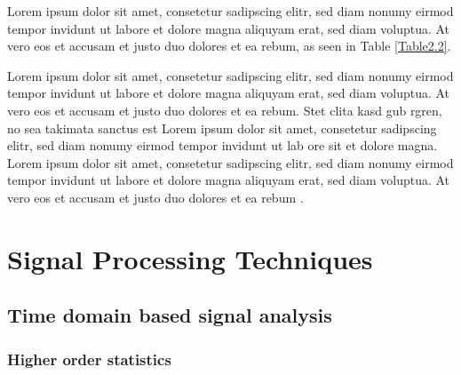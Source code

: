 
Lorem ipsum dolor sit amet, consetetur sadipscing elitr, sed diam nonumy eirmod tempor invidunt ut labore et dolore magna aliquyam erat, sed diam voluptua. At vero eos et accusam et justo duo dolores et ea rebum, as seen in Table \ref{Table2.2}. 

Lorem ipsum dolor sit amet, consetetur sadipscing elitr, sed diam nonumy eirmod tempor invidunt ut labore et dolore magna aliquyam erat, sed diam voluptua. At vero eos et accusam et justo duo dolores et ea rebum. Stet clita kasd gub rgren, no sea takimata sanctus est Lorem ipsum dolor sit amet, consetetur sadipscing elitr, sed diam nonumy eirmod tempor invidunt ut lab ore sit et dolore magna. Lorem ipsum dolor sit amet, consetetur sadipscing elitr, sed diam nonumy eirmod tempor invidunt ut labore et dolore magna aliquyam erat, sed diam voluptua. At vero eos et accusam et justo duo dolores et ea rebum \cite{Roberts_Jackson_1991}. 

\section{Signal Processing Techniques}
\subsection{Time domain based signal analysis}
\subsubsection{Higher order statistics}
